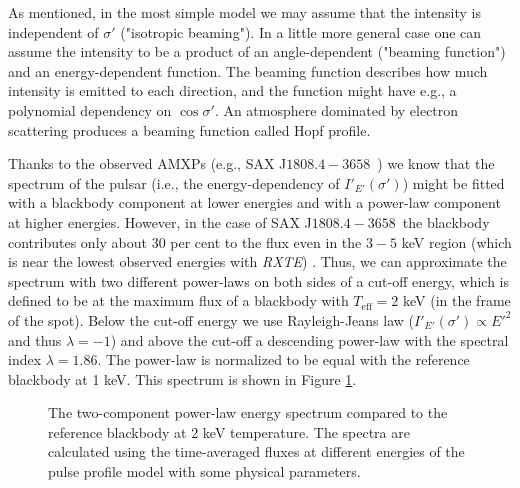 \documentclass{wihuri}
\def\Dop{\delta}
\def\source{SAX J$1808.4-3658$}
\def\ene{E}%
\begin{document}

As mentioned, in the most simple model we may assume that the intensity is independent of $\sigma'$ ("isotropic beaming"). In a little more general case one can assume the intensity to be a product of an angle-dependent ("beaming function") and an energy-dependent function. The beaming function describes how much intensity is emitted to each direction, and the function might have e.g., a polynomial dependency on $\cos \sigma'$. An atmosphere dominated by electron scattering produces a beaming function called Hopf profile.%


Thanks to the observed AMXPs (e.g., \source \ \cite{poutagierlinskisax}) we know that the spectrum of the pulsar (i.e., the energy-dependency of $I'_{\ene'}(\sigma')$) might be fitted with a blackbody component at lower energies and with a power-law component at higher energies. However, in the case of \source \ the blackbody contributes only about $30$ per cent to the flux even in the $3-5$ keV region (which is near the lowest observed energies with {\it RXTE}) \cite{poutagierlinskisax}. Thus, we can approximate the spectrum with two different power-laws on both sides of a cut-off energy, which is defined to be at the maximum flux of a blackbody with $T_{\mathrm{eff}} = 2 $ keV (in the frame of the spot). Below the cut-off energy we use Rayleigh-Jeans law ($I'_{\ene'}(\sigma') \propto E '^{2}$ and thus $\lambda = -1$) and above the cut-off a descending power-law with the spectral index $\lambda = 1.86$. The power-law is normalized to be equal with the reference blackbody at 1 keV. This spectrum is shown in Figure \ref{fig:spectrum}.


\begin{figure}
\centerline{}
\caption{The two-component power-law energy spectrum compared to the reference blackbody at $2$ keV temperature. The spectra are calculated using the time-averaged fluxes at different energies of the pulse profile model with some physical parameters. 
\label{fig:spectrum}}
\end{figure}
\end{document}
